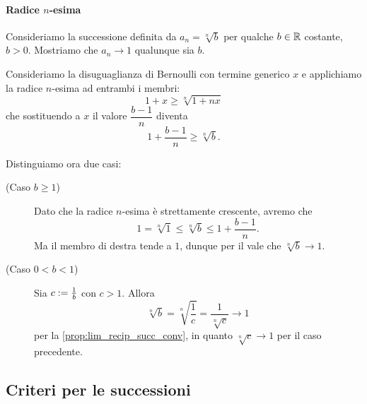 \paragraph{Radice $n$-esima} Consideriamo la successione definita da $a_n = \sqrt[n]{b}$ per qualche $b \in \mathbb{R}$ costante, $b > 0$. Mostriamo che $a_n \to 1$ qualunque sia $b$.

Consideriamo la disuguaglianza di Bernoulli con termine generico $x$ e applichiamo la radice $n$-esima ad entrambi i membri: \[
    1 + x \geq \sqrt[n]{1 + nx} 
\] che sostituendo a $x$ il valore $\dfrac{b - 1}{n}$ diventa \[
    1 + \frac{b-1}{n} \geq \sqrt[n]{b}.
\]

Distinguiamo ora due casi: \begin{description}
    \item[(Caso $b \geq 1$)] Dato che la radice $n$-esima è strettamente crescente, avremo che \[
        1 = \sqrt[n]{1} \leq \sqrt[n]{b} \leq 1 + \frac{b-1}{n}.
    \] Ma il membro di destra tende a $1$, dunque per il  vale che $\sqrt[n]{b} \to 1$.
    \item[(Caso $0 < b < 1$)] Sia $c := \frac{1}{b}$ con $c > 1$. Allora \[
        \sqrt[n]{b} = \sqrt[n]{\frac{1}{c}} = \frac{1}{\sqrt[n]{c}} \to 1
    \] per la \autoref{prop:lim_recip_succ_conv}, in quanto $\sqrt[n]{c} \to 1$ per il caso precedente.
\end{description}

\subsection{Criteri per le successioni}


